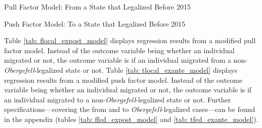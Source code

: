 \documentclass[12pt,letterpaper]{article}
\begin{document}
\begin{table}[htbp]
    \centering
    \caption{Pull Factor Model: From a State that Legalized Before 2015}
    \label{tab: flocal_expost_model}
    
\end{table}
\begin{table}[htbp] %
    \centering
    \caption{Push Factor Model: To a State that Legalized Before 2015}
    \label{tab: tlocal_exante_model}
    
\end{table}

Table \ref{tab: flocal_expost_model} displays regression results from a modified pull factor model. Instead of the outcome variable being whether an individual migrated or not, the outcome variable is if an individual migrated from a non-\textit{Obergefell}-legalized state or not. Table \ref{tab: tlocal_exante_model} displays regression results from a modified push factor model. Instead of the outcome variable being whether an individual migrated or not, the outcome variable is if an individual migrated to a non-\textit{Obergefell}-legalized state or not. Further specifications---covering the from and to \textit{Obergefell}-legalized cases---can be found in the appendix (tables \ref{tab: ffed_expost_model} and \ref{tab: tfed_exante_model}).
\end{document}
